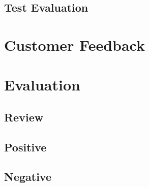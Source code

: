 \subsection{Test Evaluation}

\section{Customer Feedback}

\section{Evaluation}
\subsection{Review}
\subsection{Positive}
\subsection{Negative}
